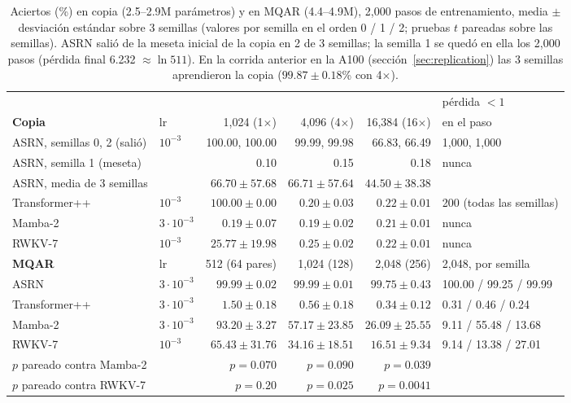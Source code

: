 \documentclass[11pt]{article}
\begin{document}
\begin{table}[t]
\centering\small
\setlength{\tabcolsep}{3pt}
\begin{tabular}{llrrrl}
\toprule
& & & & & pérdida $<1$\\
\textbf{Copia} & lr & 1{,}024 (1$\times$) & 4{,}096 (4$\times$) & 16{,}384 (16$\times$) & en el paso\\
\midrule
ASRN, semillas 0, 2 (salió) & $10^{-3}$ & 100.00, 100.00 & 99.99, 99.98 & 66.83, 66.49 & 1{,}000, 1{,}000\\
ASRN, semilla 1 (meseta) & & 0.10 & 0.15 & 0.18 & nunca\\
ASRN, media de 3 semillas & & $66.70\pm57.68$ & $66.71\pm57.64$ & $44.50\pm38.38$ & \\
Transformer++ & $10^{-3}$ & $100.00\pm0.00$ & $0.20\pm0.03$ & $0.22\pm0.01$ & 200 (todas las semillas)\\
Mamba-2 & $3\cdot10^{-3}$ & $0.19\pm0.07$ & $0.19\pm0.02$ & $0.21\pm0.01$ & nunca\\
RWKV-7 & $10^{-3}$ & $25.77\pm19.98$ & $0.25\pm0.02$ & $0.22\pm0.01$ & nunca\\
\midrule
\textbf{MQAR} & lr & 512 (64 pares) & 1{,}024 (128) & 2{,}048 (256) & 2{,}048, por semilla\\
\midrule
ASRN & $3\cdot10^{-3}$ & $\mathbf{99.99\pm0.02}$ & $\mathbf{99.99\pm0.01}$ & $\mathbf{99.75\pm0.43}$ &
100.00 / 99.25 / 99.99\\
Transformer++ & $3\cdot10^{-3}$ & $1.50\pm0.18$ & $0.56\pm0.18$ & $0.34\pm0.12$ & 0.31 / 0.46 / 0.24\\
Mamba-2 & $3\cdot10^{-3}$ & $93.20\pm3.27$ & $57.17\pm23.85$ & $26.09\pm25.55$ & 9.11 / 55.48 / 13.68\\
RWKV-7 & $10^{-3}$ & $65.43\pm31.76$ & $34.16\pm18.51$ & $16.51\pm9.34$ & 9.14 / 13.38 / 27.01\\
$p$ pareado contra Mamba-2 & & $p=0.070$ & $p=0.090$ & $p=0.039$ & \\
$p$ pareado contra RWKV-7 & & $p=0.20$ & $p=0.025$ & $p=0.0041$ & \\
\bottomrule
\end{tabular}
\caption{Aciertos (\%) en copia (2.5--2.9M parámetros) y en MQAR (4.4--4.9M), 2{,}000 pasos de entrenamiento, media
$\pm$ desviación estándar sobre 3 semillas (valores por semilla en el orden 0 / 1 / 2; pruebas $t$ pareadas sobre las
semillas). ASRN salió de la meseta inicial de la
copia en 2 de 3 semillas; la semilla 1 se quedó en ella los 2{,}000 pasos (pérdida final 6.232 $\approx\ln 511$). En la
corrida anterior en la A100 (sección~\ref{sec:replication}) las 3 semillas aprendieron la copia ($99.87\pm0.18$\% con
4$\times$).}
\label{tab:copy}
\end{table}
\end{document}

